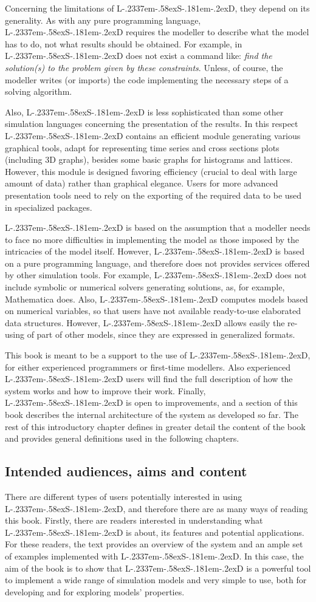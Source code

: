 \documentclass [11pt,a4paper] {book}
\def\LsD{{L\kern-.2337em\lower-.58ex\hbox{S}\kern-.181em\lower-.2ex\hbox{D}}\xspace}
\begin{document}
Concerning the limitations of \LsD, they depend on its generality. As with any pure programming language, \LsD requires the modeller to describe what the model has to do, not what results should be obtained. For example, in \LsD does not exist a command like: \textit{find the solution(s) to the problem given by these constraints}. Unless, of course, the modeller writes (or imports) the code implementing the necessary steps of a solving algorithm.

Also, \LsD is less sophisticated than some other simulation languages concerning the presentation of the results. In this respect \LsD contains an efficient module generating various graphical tools, adapt for representing time series and cross sections plots (including 3D graphs), besides some basic graphs for histograms and lattices. However, this module is designed favoring efficiency (crucial to deal with large amount of data) rather than graphical elegance. Users for more advanced presentation tools need to rely on the exporting of the required data to be used in specialized packages.

\LsD is based on the assumption that a modeller needs to face no more difficulties in implementing the model as those imposed by the intricacies of the model itself. However, \LsD is based on a pure programming language, and therefore does not provides services offered by other simulation tools. For example, \LsD does not include symbolic or numerical solvers generating solutions, as, for example, Mathematica does. Also, \LsD computes models based on numerical variables, so that users have not available ready-to-use elaborated data structures. However, \LsD allows easily the re-using of part of other models, since they are expressed in generalized formats.

This book is meant to be a support to the use of \LsD, for either experienced programmers or first-time modellers. Also experienced \LsD users will find the full description of how the system works and how to improve their work. Finally, \LsD is open to improvements, and a section of this book describes the internal architecture of the system as developed so far. The rest of this introductory chapter defines in greater detail the content of the book and provides general definitions used in the following chapters.

\subsection{Intended audiences, aims and content}
There are different types of users potentially interested in using \LsD, and therefore there are as many ways of reading this book. Firstly, there are readers interested in understanding what \LsD is about, its features and potential applications. For these readers, the text provides an overview of the system and an ample set of examples implemented with \LsD. In this case, the aim of the book is to show that \LsD is a powerful tool to implement a wide range of simulation models and very simple to use, both for developing and for exploring models' properties. 
\end{document}
